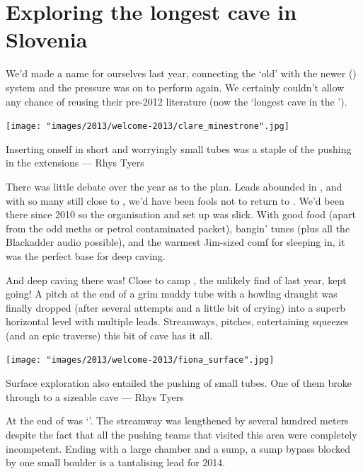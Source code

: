 
\section{Exploring the longest cave in Slovenia}

We'd made a name for ourselves last year, connecting the `old'  with the newer  () system and the pressure was on to perform again. We certainly couldn't allow  any chance of reusing their pre-2012 literature (now the `longest cave in the '). 

\begin{marginfigure}
\texttt{[image: "images/2013/welcome-2013/clare\_minestrone".jpg]}
\caption{Inserting onself in short and worryingly small tubes was a staple of the pushing in the  extensions --- Rhys Tyers}
\label{clare_minestrone}
\end{marginfigure}

There was little debate over the year as to the plan. Leads abounded in , and with so many still close to , we'd have been fools not to return to . We'd been there since 2010 so the organisation and set up was slick. With good food (apart from the odd meths or petrol contaminated packet), bangin' tunes (plus all the Blackadder audio possible), and the warmest Jim-sized comf for sleeping in, it was the perfect base for deep caving.

And deep caving there was! Close to camp , the unlikely find of last year, kept going! A pitch at the end of a grim muddy tube with a howling draught was finally dropped (after several attempts and a little bit of crying) into a superb horizontal level with multiple leads. Streamways, pitches, entertaining squeezes (and an epic traverse) this bit of cave has it all.

\begin{marginfigure}
\texttt{[image: "images/2013/welcome-2013/fiona\_surface".jpg]}
\caption{Surface exploration also entailed the pushing of small tubes. One of them broke through to a sizeable cave --- Rhys Tyers}
\label{fiona_surface}
\end{marginfigure}

At the end of  was `'. The streamway was lengthened by several hundred meters despite the fact that all the pushing teams that visited this area were completely incompetent. Ending with a large chamber and a sump, a sump bypass blocked by one small boulder is a tantalising lead for 2014.

